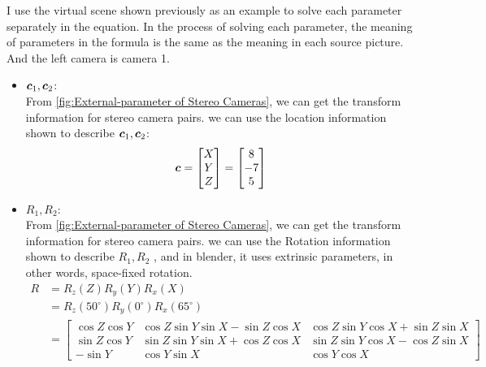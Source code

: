 I use the virtual scene shown previously as an example to solve each parameter separately in the equation. In the process of solving each parameter, the meaning of parameters in the formula is the same as the  meaning in each source picture. And the left camera is camera 1.
\begin{itemize}
	\item {\Large $\boldsymbol{c}_{1},\boldsymbol{c}_{2}$}: \\
	From \cref{fig:External-parameter of Stereo Cameras}, we can get the transform information for stereo camera pairs. we can use the location information shown to describe $\boldsymbol{c}_{1},\boldsymbol{c}_{2}$:
	\begin{align}
		\boldsymbol{c} = \begin{bmatrix}
		X\\
		Y\\
		Z
		\end{bmatrix}= \begin{bmatrix}8 \\-7\\5 \end{bmatrix}
	\end{align}
	\item {\Large $R_{1},R_{2}$}: \\
	From \cref{fig:External-parameter of Stereo Cameras}, we can get the transform information for stereo camera pairs. we can use the Rotation information shown to describe $R_{1},R_{2}$ \cite{bernerTechnicalConceptsOrientation2008}, and in blender, it uses extrinsic parameters, in other words, space-fixed rotation.
	\begin{align}
		R &= R_z(Z) R_y(Y) R_x(X) \nonumber \\
			& = R_z(50^{\circ}) R_y(0^{\circ}) R_x(65^{\circ}) \nonumber \\
			& = \begin{bmatrix}
			\cos Z \cos Y & \cos Z \sin Y \sin X - \sin Z \cos X& \cos Z \sin Y \cos X + \sin Z \sin X\\
			\sin Z \cos Y & \sin Z \sin Y \sin X + \cos Z \cos X & \sin Z \sin Y \cos X -\cos Z \sin X \\
			-\sin Y& \cos Y \sin X& \cos Y \cos X
		\end{bmatrix}
	\end{align}


\end{itemize}
